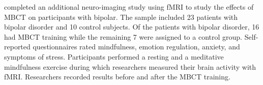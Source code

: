 \cite{ives-deliperi_effects_2013} completed an additional neuro-imaging study using fMRI to study the effects of MBCT on participants with bipolar. The sample included 23 patients with bipolar disorder and 10 control subjects. Of the patients with bipolar disorder, 16 had MBCT training while the remaining 7 were assigned to a control group. Self-reported questionnaires rated mindfulness, emotion regulation, anxiety, and symptoms of stress. Participants performed a resting and a meditative mindfulness exercise during which researchers measured their brain activity with fMRI. Researchers recorded results before and after the MBCT training.
  